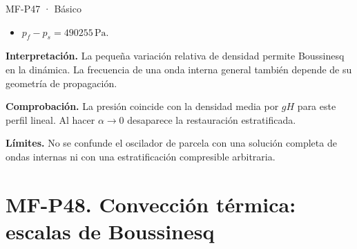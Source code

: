 \begin{studiumworked}{MF-P47 · Básico}
\begin{itemize}
\item $p_f-p_s=490255\,\mathrm{Pa}$.

\end{itemize}

\textbf{Interpretación.} La pequeña variación relativa de densidad permite Boussinesq en la dinámica. La frecuencia de una onda interna general también depende de su geometría de propagación.

\textbf{Comprobación.} La presión coincide con la densidad media por $gH$ para este perfil lineal. Al hacer $\alpha\to0$ desaparece la restauración estratificada.

\textbf{Límites.} No se confunde el oscilador de parcela con una solución completa de ondas internas ni con una estratificación compresible arbitraria.

\end{studiumworked}



\Needspace{.30\textheight}\section{MF-P48. Convección térmica: escalas de Boussinesq}

